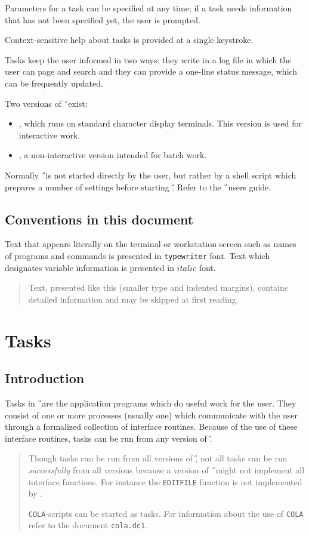 Parameters for a task can be specified at any time; if a task needs information
that has not been specified yet, the user is prompted.

Context-sensitive help about tasks is provided at a single keystroke.

Tasks keep the user informed in two ways: they write in a log file
in which the user can page and search and they can provide a one-line status
message, which can be frequently updated.

Two versions of \H\ exist:
\begin{itemize}
\item \tH, which runs on standard character display terminals.
This version is used for interactive work.
\item \nH, a non-interactive version intended for batch work.
\end{itemize}
Normally \H\ is not started directly by the user, but rather by a shell script
which prepares a number of settings before starting \H. Refer to the
\G\ users guide.
\section*{Conventions in this document}

Text that appears literally on the terminal or workstation  screen such as
names of programs and commands is presented in {\tt typewriter} font.
Text which designates variable information is presented in $italic$ font.

\begin{quote}
\small Text, presented like this (smaller type and indented margins), contains
detailed information and may be skipped at first reading.
\end{quote}
\chapter{Tasks}

\section{Introduction}
Tasks in \G\ are the application programs which do useful work for the user.
They consist of one or more processes (usually one) which communicate with
the user through a formalized collection of interface routines.
Because of the use of these interface routines, tasks can be run from any
version of \H.

\begin{quote}
\small Though tasks can be run from all versions of \H, not all tasks
can be run {\em successfully} from all versions because a version of \H\ might
not implement all interface functions.
For instance the {\tt EDITFILE} function is not
implemented by \nH.

{\tt COLA}-scripts can be started as tasks. For information
about the use of {\tt COLA} refer to the document {\tt cola.dc1}.
\end{quote}

